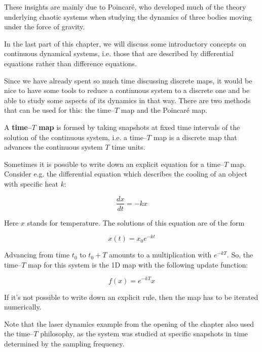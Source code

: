 These insights are mainly due to Poincar\'{e}, who developed much of the theory underlying chaotic systems when studying the dynamics of three bodies moving under the force of gravity.

\pagebreak


In the last part of this chapter, we will discuss some introductory concepts on continuous dynamical systems, i.e. those that are described by differential equations rather than difference equations.

Since we have already spent so much time discussing discrete maps, it would be nice to have some tools to reduce a continuous system to a discrete one and be able to study some aspects of its dynamics in that way. There are two methods that can be used for this: the time--$T$ map and the Poincar\'{e} map.

A \textbf{time--$T$ map} is formed by taking snapshots at fixed time intervals of the solution of the continuous system, i.e. a time--$T$ map is a discrete map that advances the continuous system $T$ time units. 

Sometimes it is possible to write down an explicit equation for a time--$T$ map. Consider e.g. the differential equation which describes the cooling of an object with specific heat $k$:

\begin{equation}
\frac{dx}{dt} = -k x
\end{equation} 

Here $x$ stands for temperature. The solutions of this equation are of the form

\begin{equation}
x(t) = x_0 e^{-kt}
\end{equation} 

Advancing from time $t_0$ to $t_0+T$ amounts to a multiplication with $e^{-kT}$. So, the time--$T$ map for this system is the 1D map with the following update function:

\begin{equation}
f(x) = e^{-kT} x
\end{equation} 

If it's not possible to write down an explicit rule, then the map has to be iterated numerically.

Note that the laser dynamics example from the opening of the chapter also used the time--$T$ philosophy, as the system was studied at specific snapshots in time determined by the sampling frequency.

